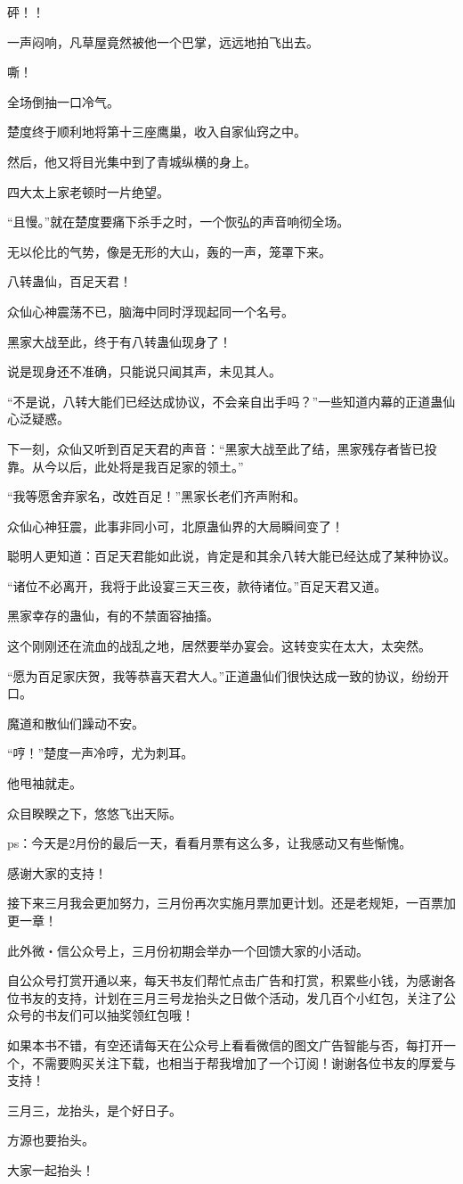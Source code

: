 \begin{this_body}
砰！！

一声闷响，凡草屋竟然被他一个巴掌，远远地拍飞出去。

嘶！

全场倒抽一口冷气。

楚度终于顺利地将第十三座鹰巢，收入自家仙窍之中。

然后，他又将目光集中到了青城纵横的身上。

四大太上家老顿时一片绝望。

“且慢。”就在楚度要痛下杀手之时，一个恢弘的声音响彻全场。

无以伦比的气势，像是无形的大山，轰的一声，笼罩下来。

八转蛊仙，百足天君！

众仙心神震荡不已，脑海中同时浮现起同一个名号。

黑家大战至此，终于有八转蛊仙现身了！

说是现身还不准确，只能说只闻其声，未见其人。

“不是说，八转大能们已经达成协议，不会亲自出手吗？”一些知道内幕的正道蛊仙心泛疑惑。

下一刻，众仙又听到百足天君的声音：“黑家大战至此了结，黑家残存者皆已投靠。从今以后，此处将是我百足家的领土。”

“我等愿舍弃家名，改姓百足！”黑家长老们齐声附和。

众仙心神狂震，此事非同小可，北原蛊仙界的大局瞬间变了！

聪明人更知道：百足天君能如此说，肯定是和其余八转大能已经达成了某种协议。

“诸位不必离开，我将于此设宴三天三夜，款待诸位。”百足天君又道。

黑家幸存的蛊仙，有的不禁面容抽搐。

这个刚刚还在流血的战乱之地，居然要举办宴会。这转变实在太大，太突然。

“愿为百足家庆贺，我等恭喜天君大人。”正道蛊仙们很快达成一致的协议，纷纷开口。

魔道和散仙们躁动不安。

“哼！”楚度一声冷哼，尤为刺耳。

他甩袖就走。

众目睽睽之下，悠悠飞出天际。

ps：今天是2月份的最后一天，看看月票有这么多，让我感动又有些惭愧。

感谢大家的支持！

接下来三月我会更加努力，三月份再次实施月票加更计划。还是老规矩，一百票加更一章！

此外微・信公众号上，三月份初期会举办一个回馈大家的小活动。

自公众号打赏开通以来，每天书友们帮忙点击广告和打赏，积累些小钱，为感谢各位书友的支持，计划在三月三号龙抬头之日做个活动，发几百个小红包，关注了公众号的书友们可以抽奖领红包哦！

如果本书不错，有空还请每天在公众号上看看微信的图文广告智能与否，每打开一个，不需要购买关注下载，也相当于帮我增加了一个订阅！谢谢各位书友的厚爱与支持！

三月三，龙抬头，是个好日子。

方源也要抬头。

大家一起抬头！

\end{this_body}

